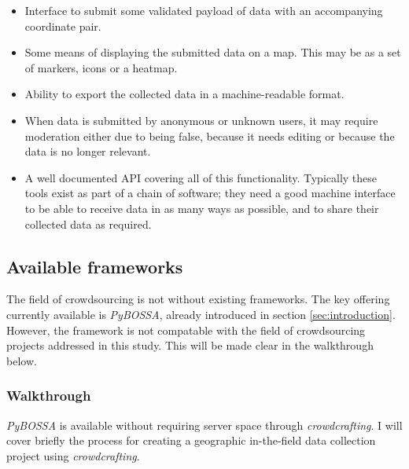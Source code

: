 \documentclass{article}
\begin{document}
		\begin{itemize}
			\item Interface to submit some validated payload of data with an accompanying coordinate pair.
			\item Some means of displaying the submitted data on a map. This may be as a set of markers, icons or a heatmap.
			\item Ability to export the collected data in a machine-readable format.
			\item When data is submitted by anonymous or unknown users, it may require moderation either due to being false, because it needs editing or because the data is no longer relevant.
			\item A well documented API covering all of this functionality. Typically these tools exist as part of a chain of software; they need a good machine interface to be able to receive data in as many ways as possible, and to share their collected data as required.
		\end{itemize}

		\subsection{Available frameworks}

		The field of crowdsourcing is not without existing frameworks. The key offering currently available is \textit{PyBOSSA}, already introduced in section \ref{sec:introduction}. However, the framework is not compatable with the field of crowdsourcing projects addressed in this study. This will be made clear in the walkthrough below.

		\subsubsection{Walkthrough}

		\textit{PyBOSSA} is available without requiring server space through \textit{crowdcrafting}. I will cover briefly the process for creating a geographic in-the-field data collection project using \textit{crowdcrafting}.
\end{document}
